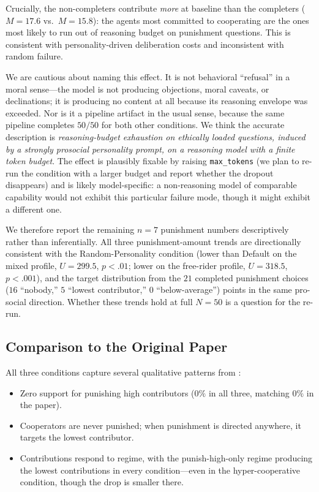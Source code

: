 \documentclass[12pt, a4paper]{article}
\begin{document}
Crucially, the non-completers contribute \emph{more} at baseline than the completers ($M=17.6$ vs.\ $M=15.8$): the agents most committed to cooperating are the ones most likely to run out of reasoning budget on punishment questions. This is consistent with personality-driven deliberation costs and inconsistent with random failure.

We are cautious about naming this effect. It is not behavioral ``refusal'' in a moral sense---the model is not producing objections, moral caveats, or declinations; it is producing no content at all because its reasoning envelope was exceeded. Nor is it a pipeline artifact in the usual sense, because the same pipeline completes $50/50$ for both other conditions. We think the accurate description is \emph{reasoning-budget exhaustion on ethically loaded questions, induced by a strongly prosocial personality prompt, on a reasoning model with a finite token budget}. The effect is plausibly fixable by raising \texttt{max\_tokens} (we plan to re-run the condition with a larger budget and report whether the dropout disappears) and is likely model-specific: a non-reasoning model of comparable capability would not exhibit this particular failure mode, though it might exhibit a different one.

We therefore report the remaining $n=7$ punishment numbers descriptively rather than inferentially. All three punishment-amount trends are directionally consistent with the Random-Personality condition (lower than Default on the mixed profile, $U=299.5$, $p<.01$; lower on the free-rider profile, $U=318.5$, $p<.001$), and the target distribution from the $21$ completed punishment choices ($16$ ``nobody,'' $5$ ``lowest contributor,'' $0$ ``below-average'') points in the same pro-social direction. Whether these trends hold at full $N=50$ is a question for the re-run.

\subsection{Comparison to the Original Paper}
\label{sec:paper-comparison}

All three conditions capture several qualitative patterns from \citet{ertan2009who}:
\begin{itemize}
  \item Zero support for punishing high contributors ($0\%$ in all three, matching $0\%$ in the paper).
  \item Cooperators are never punished; when punishment is directed anywhere, it targets the lowest contributor.
  \item Contributions respond to regime, with the punish-high-only regime producing the lowest contributions in every condition---even in the hyper-cooperative condition, though the drop is smaller there.
\end{itemize}
\end{document}
